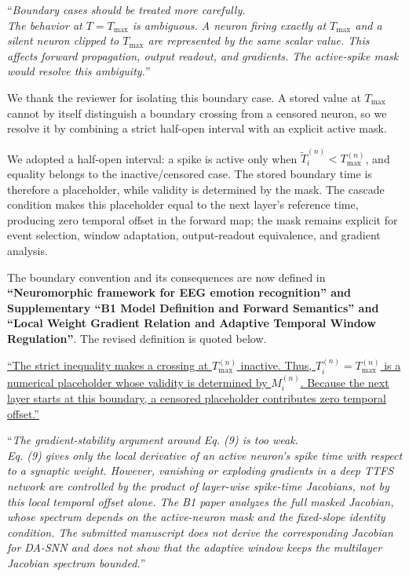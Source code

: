 \documentclass[12pt,technote,onecolumn]{IEEEtran}
\begin{document}
\vspace{4mm}

``{\it Boundary cases should be treated more carefully.\\
The behavior at \(T = T_{\max}\) is ambiguous. A neuron firing exactly
at \(T_{\max}\) and a silent neuron clipped to \(T_{\max}\) are
represented by the same scalar value. This affects forward propagation,
output readout, and gradients. The active-spike mask would resolve this
ambiguity.}''
\vspace{1mm}


We thank the reviewer for isolating this boundary case. A stored value at \(T_{\max}\) cannot by itself distinguish a boundary crossing from a censored neuron, so we resolve it by combining a strict half-open interval with an explicit active mask.

We adopted a half-open interval: a spike is active only when
\(\tilde{T}_i^{(n)}<T_{\max}^{(n)}\), and equality belongs to the
inactive/censored case. The stored boundary time is therefore a
placeholder, while validity is determined by the mask. The cascade
condition makes this placeholder equal to the next layer's reference
time, producing zero temporal offset in the forward map; the mask
remains explicit for event selection, window adaptation, output-readout
equivalence, and gradient analysis.



The boundary convention and its consequences are now defined in \textbf{``Neuromorphic framework for EEG emotion recognition'' and Supplementary ``B1 Model Definition and Forward Semantics'' and ``Local Weight Gradient Relation and Adaptive Temporal Window Regulation''}. The revised definition is quoted below.

\uline{``The strict inequality makes a crossing at $T_{\max}^{(n)}$ inactive. Thus, $T_i^{(n)}=T_{\max}^{(n)}$ is a numerical placeholder whose validity is determined by $M_i^{(n)}$. Because the next layer starts at this boundary, a censored placeholder contributes zero temporal offset.''}

\vspace{4mm}

``{\it The gradient-stability argument around Eq. (9) is too weak.\\
Eq. (9) gives only the local derivative of an active neuron's spike time
with respect to a synaptic weight. However, vanishing or exploding
gradients in a deep TTFS network are controlled by the product of
layer-wise spike-time Jacobians, not by this local temporal offset
alone. The B1 paper analyzes the full masked Jacobian, whose spectrum
depends on the active-neuron mask and the fixed-slope identity
condition. The submitted manuscript does not derive the corresponding
Jacobian for DA-SNN and does not show that the adaptive window keeps the
multilayer Jacobian spectrum bounded.}''
\vspace{1mm}
\end{document}
